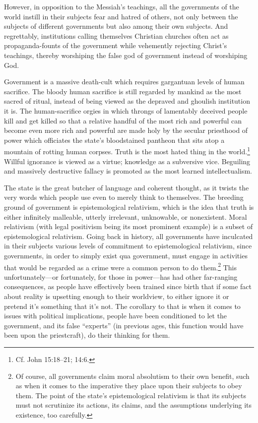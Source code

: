 \documentclass[letterpaper,12pt]{article}
\begin{document}
However, in opposition to the Messiah's teachings, all the governments of the world instill in their subjects fear and hatred of others, not only between the subjects of different governments but also among their own subjects. And regrettably, institutions calling themselves Christian churches often act as propaganda-founts of the government while vehemently rejecting Christ's teachings, thereby worshiping the false god of government instead of worshiping God.

Government is a massive death-cult which requires gargantuan levels of human sacrifice. The bloody human sacrifice is still regarded by mankind as the most sacred of ritual, instead of being viewed as the depraved and ghoulish institution it is. The human-sacrifice orgies in which throngs of lamentably deceived people kill and get killed so that a relative handful of the most rich and powerful can become even more rich and powerful are made holy by the secular priesthood of power which officiates the state's bloodstained pantheon that sits atop a mountain of rotting human corpses. Truth is the most hated thing in the world.\footnote{Cf. John 15:18--21; 14:6.} Willful ignorance is viewed as a virtue; knowledge as a subversive vice. Beguiling and massively destructive fallacy is promoted as the most learned intellectualism.

The state is the great butcher of language and coherent thought, as it twists the very words which people use even to merely think to themselves. The breeding ground of government is epistemological relativism, which is the idea that truth is either infinitely malleable, utterly irrelevant, unknowable, or nonexistent. Moral relativism (with legal positivism being its most prominent example) is a subset of epistemological relativism. Going back in history, all governments have inculcated in their subjects various levels of commitment to epistemological relativism, since governments, in order to simply exist qua government, must engage in activities that would be regarded as a crime were a common person to do them.\footnote{Of course, all governments claim moral absolutism to their own benefit, such as when it comes to the imperative they place upon their subjects to obey them. The point of the state's epistemological relativism is that its subjects must not scrutinize its actions, its claims, and the assumptions underlying its existence, too carefully.} This unfortunately---or fortunately, for those in power---has had other far-ranging consequences, as people have effectively been trained since birth that if some fact about reality is upsetting enough to their worldview, to either ignore it or pretend it's something that it's not. The corollary to that is when it comes to issues with political implications, people have been conditioned to let the government, and its false ``experts'' (in previous ages, this function would have been upon the priestcraft), do their thinking for them.
\end{document}
